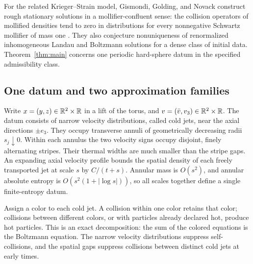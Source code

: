 For the related Krieger--Strain model, Gismondi, Golding, and Novack
construct rough stationary solutions in a mollifier-confluent sense:
the collision operators of mollified densities tend to zero in
distributions for every nonnegative Schwartz mollifier of mass one
\cite[Definition~1.3 and Theorem~1.5]{GismondiGoldingNovack2026}.
They also conjecture
nonuniqueness of renormalized inhomogeneous Landau and Boltzmann solutions
for a dense class of initial data. Theorem~\ref{thm:main} concerns one
periodic hard-sphere datum in the specified admissibility class.

\subsection{One datum and two approximation families}

Write \(x=(y,z)\in\mathbb R^2\times\mathbb R\) in a lift of the torus, and
\(v=(\bar v,v_3)\in\mathbb R^2\times\mathbb R\). The datum consists of narrow
velocity distributions, called cold jets, near the axial directions
\(\pm e_3\). They occupy transverse annuli of geometrically decreasing
radii \(s_j\downarrow0\). Within each annulus the two velocity signs
occupy disjoint, finely alternating stripes. Their thermal widths are
much smaller than the stripe gaps. An expanding axial velocity profile
bounds the spatial density of each freely transported jet at scale
\(s\) by \(C/(t+s)\). Annular mass is \(O(s^2)\), and annular absolute entropy
is \(O(s^2(1+|\log s|))\), so all scales together define a single
finite-entropy datum.

Assign a color to each cold jet. A collision within one color retains
that color; collisions between different colors, or with particles
already declared hot, produce hot particles. This is an exact
decomposition: the sum of the colored equations is the Boltzmann
equation. The narrow velocity distributions suppress self-collisions,
and the spatial gaps suppress collisions between distinct cold jets
at early times.

